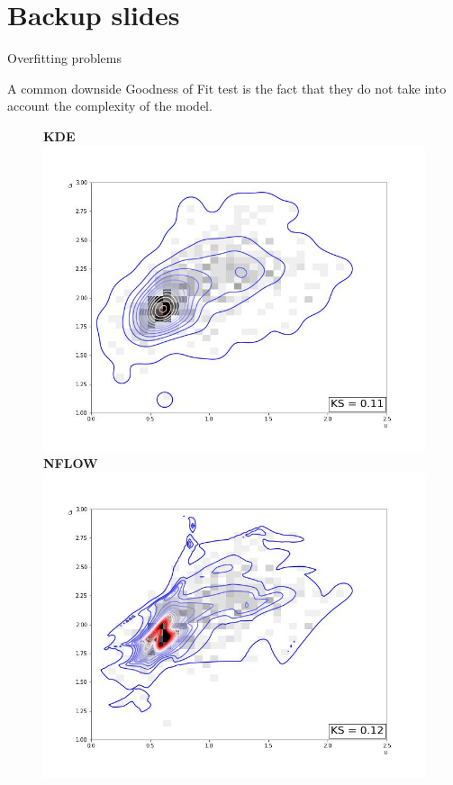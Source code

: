 \documentclass[10pt]{beamer}
\begin{document}
\section{Backup slides}

\begin{frame}{Overfitting problems}

    A common downside Goodness of Fit test is the fact that they do not take into
    account the complexity of the model.

    \begin{figure}[!htb]
            \centering \textbf{KDE}
          \includegraphics[width=\linewidth]{figures/uranium15_kde_contour.jpg}
        \endminipage\hfill
        \centering
        \textbf{NFLOW}
          \includegraphics[width=\linewidth]{figures/uranium15_nflow_contour.jpg}

\end{figure}
\end{frame}
\end{document}
